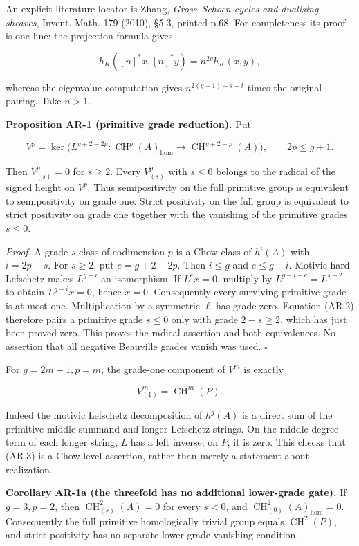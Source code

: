 \documentclass[11pt,a4paper]{article}
\begin{document}
An explicit literature locator is Zhang, \emph{Gross--Schoen cycles and
dualising sheaves}, Invent. Math. 179 (2010), §5.3, printed p.68. For
completeness its proof is one line: the projection formula gives

\[
h_K([n]^*x,[n]^*y)=n^{2g}h_K(x,y),
\]

whereas the eigenvalue computation gives \(n^{2(g+1)-s-t}\) times the
original pairing. Take \(n>1\).

\textbf{Proposition AR-1 (primitive grade reduction).} Put

\[
V^p=\ker\bigl(L^{g+2-2p}:\operatorname{CH}^p(A)_{\mathrm{hom}}
\longrightarrow\operatorname{CH}^{g+2-p}(A)\bigr),\qquad 2p\le g+1.
\]

Then \(V^p_{(s)}=0\) for \(s\ge2\). Every \(V^p_{(s)}\) with \(s\le0\)
belongs to the radical of the signed height on \(V^p\). Thus
semipositivity on the full primitive group is equivalent to
semipositivity on grade one. Strict positivity on the full group is
equivalent to strict positivity on grade one together with the vanishing
of the primitive grades \(s\le0\).

\emph{Proof.} A grade-\(s\) class of codimension \(p\) is a Chow class
of \(h^i(A)\) with \(i=2p-s\). For \(s\ge2\), put \(e=g+2-2p\). Then
\(i\le g\) and \(e\le g-i\). Motivic hard Lefschetz makes \(L^{g-i}\) an
isomorphism. If \(L^e x=0\), multiply by \(L^{g-i-e}=L^{s-2}\) to obtain
\(L^{g-i}x=0\), hence \(x=0\). Consequently every surviving primitive
grade is at most one. Multiplication by a symmetric \(\ell\) has grade
zero. Equation (AR.2) therefore pairs a primitive grade \(s\le0\) only
with grade \(2-s\ge2\), which has just been proved zero. This proves the
radical assertion and both equivalences. No assertion that all negative
Beauville grades vanish was used. \(\square\)

For \(g=2m-1,p=m\), the grade-one component of \(V^m\) is exactly

\[
V^m_{(1)}=\operatorname{CH}^m(P).
\tag{AR.3}
\]

Indeed the motivic Lefschetz decomposition of \(h^g(A)\) is a direct sum
of the primitive middle summand and longer Lefschetz strings. On the
middle-degree term of each longer string, \(L\) has a left inverse; on
\(P\), it is zero. This checks that (AR.3) is a Chow-level assertion,
rather than merely a statement about realization.

\textbf{Corollary AR-1a (the threefold has no additional lower-grade
gate).} If \(g=3,p=2\), then \(\operatorname{CH}^2_{(s)}(A)=0\) for
every \(s<0\), and \(\operatorname{CH}^2_{(0)}(A)_{\mathrm{hom}}=0\).
Consequently the full primitive homologically trivial group equals
\(\operatorname{CH}^2(P)\), and strict positivity has no separate
lower-grade vanishing condition.
\end{document}
